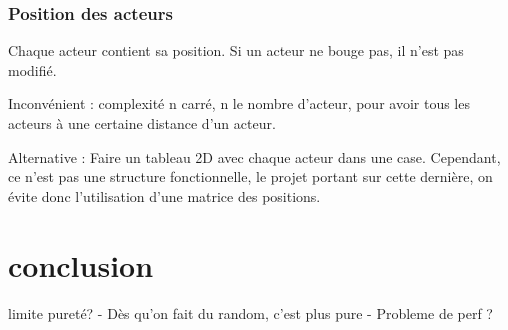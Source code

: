 \documentclass{article}
\begin{document}
\subsubsection{Position des acteurs}
Chaque acteur contient sa position.
Si un acteur ne bouge pas, il n'est pas modifié.

Inconvénient : complexité n carré, n le nombre d'acteur, pour avoir tous les acteurs à une certaine distance d'un acteur.

Alternative : Faire un tableau 2D avec chaque acteur dans une case. Cependant, ce n'est pas une structure fonctionnelle, 
le projet portant sur cette dernière, on évite donc l'utilisation d'une matrice des positions.

\section{conclusion}
limite pureté?
- Dès qu'on fait du random, c'est plus pure
- Probleme de perf ?
\end{document}
